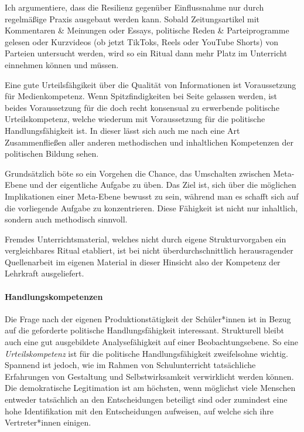 Ich argumentiere, dass die Resilienz gegenüber Einflussnahme nur durch regelmäßige Praxis ausgebaut werden kann. Sobald Zeitungsartikel mit Kommentaren \& Meinungen oder Essays, politische Reden \& Parteiprogramme gelesen oder Kurzvideos (ob jetzt TikToks, Reels oder YouTube Shorts) von Parteien untersucht werden, wird so ein Ritual dann mehr Platz im Unterricht einnehmen können und müssen. 

Eine gute Urteilsfähgikeit über die Qualität von Informationen ist Voraussetzung für Medienkompetenz. Wenn Spitzfindigkeiten bei Seite gelassen werden, ist beides Voraussetzung für die doch recht konsensual zu erwerbende politische Urteilskompetenz, welche wiederum mit Voraussetzung für die politische Handlungsfähigkeit ist. In dieser lässt sich auch \gls{me} nach eine Art Zusammenfließen aller anderen methodischen und inhaltlichen Kompetenzen der politischen Bildung sehen. 

Grundsätzlich böte so ein Vorgehen die Chance, das Umschalten zwischen Meta-Ebene und der eigentliche Aufgabe zu üben. Das Ziel ist, sich über die möglichen Implikationen einer Meta-Ebene bewusst zu sein, während man es schafft sich auf die vorliegende Aufgabe zu konzentrieren. Diese Fähigkeit ist nicht nur inhaltlich, sondern auch methodisch sinnvoll. 
\bigskip

Fremdes Unterrichtsmaterial, welches nicht durch eigene Strukturvorgaben ein vergleichbares Ritual etabliert, ist bei nicht überdurchschnittlich herausragender Quellenarbeit im eigenen Material in dieser Hinsicht also der Kompetenz der Lehrkraft ausgeliefert. 



\paragraph{Handlungskompetenzen}
Die Frage nach der eigenen Produktionstätigkeit der Schüler*innen ist in Bezug auf die geforderte politische Handlungsfähigkeit interessant. Strukturell bleibt auch eine gut ausgebildete Analysefähigkeit auf einer Beobachtungsebene. So eine \emph{Urteilskompetenz} ist für die politische Handlungsfähigkeit zweifelsohne wichtig. Spannend ist jedoch, wie im Rahmen von Schulunterricht tatsächliche Erfahrungen von Gestaltung und Selbstwirksamkeit verwirklicht werden können. Die demokratische Legitimation ist am höchsten, wenn möglichst viele Menschen entweder tatsächlich an den Entscheidungen beteiligt sind oder zumindest eine hohe Identifikation mit den Entscheidungen aufweisen, auf welche sich ihre Vertreter*innen einigen. 


